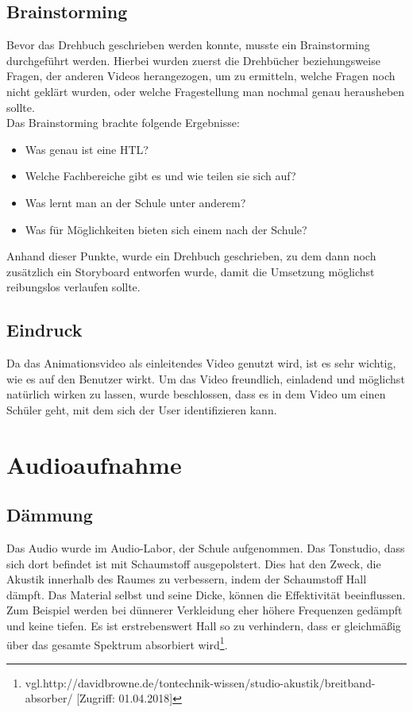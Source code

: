 \subsection{Brainstorming}
Bevor das Drehbuch geschrieben werden konnte, musste ein Brainstorming durchgeführt werden. Hierbei wurden zuerst die Drehbücher beziehungsweise Fragen, der anderen Videos herangezogen, um zu ermitteln, welche Fragen noch nicht geklärt wurden, oder welche Fragestellung man nochmal genau herausheben sollte.
\leavevmode \\
Das Brainstorming brachte folgende Ergebnisse:
\begin{itemize}
\item Was genau ist eine HTL?
\item Welche Fachbereiche gibt es und wie teilen sie sich auf?
\item Was lernt man an der Schule unter anderem?
\item Was für Möglichkeiten bieten sich einem nach der Schule?
\end{itemize}
Anhand dieser Punkte, wurde ein Drehbuch geschrieben, zu dem dann noch zusätzlich ein Storyboard entworfen wurde, damit die Umsetzung möglichst reibungslos verlaufen sollte.

\subsection{Eindruck}
Da das Animationsvideo als einleitendes Video genutzt wird, ist es sehr wichtig, wie es auf den Benutzer wirkt. Um das Video freundlich, einladend und möglichst natürlich wirken zu lassen, wurde beschlossen, dass es in dem Video um einen Schüler geht, mit dem sich der User identifizieren kann.

\section{Audioaufnahme}
\subsection{Dämmung}
Das Audio wurde im Audio-Labor, der Schule aufgenommen. Das Tonstudio, dass sich dort befindet ist mit Schaumstoff ausgepolstert. Dies hat den Zweck, die Akustik innerhalb des Raumes zu verbessern, indem der Schaumstoff Hall dämpft. Das Material selbst und seine Dicke, können die Effektivität beeinflussen. Zum Beispiel werden bei dünnerer Verkleidung eher höhere Frequenzen gedämpft und keine tiefen. Es ist erstrebenswert Hall so zu verhindern, dass er gleichmäßig über das gesamte Spektrum absorbiert wird\footnote{\label{} vgl.http://davidbrowne.de/tontechnik-wissen/studio-akustik/breitband-absorber/ [Zugriff: 01.04.2018]}. 
